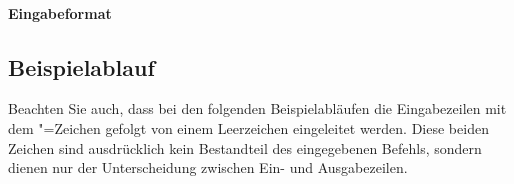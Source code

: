 \documentclass[ngerman, gray]{sdqassignment}
\begin{document}
\paragraph{Eingabeformat}

\subsection{Beispielablauf}
Beachten Sie auch, dass bei den folgenden Beispielabläufen die Eingabezeilen mit dem \txt{>}"=Zeichen gefolgt von einem Leerzeichen eingeleitet werden. Diese beiden Zeichen sind ausdrücklich kein Bestandteil des eingegebenen Befehls, sondern dienen nur der Unterscheidung zwischen Ein- und Ausgabezeilen.

\end{document}
